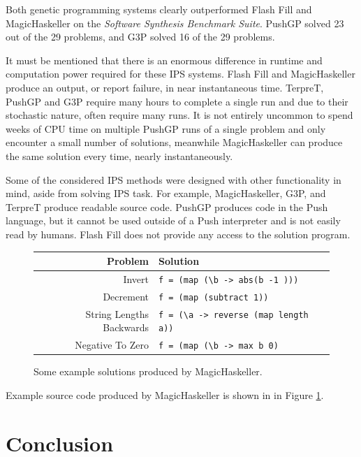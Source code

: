 Both genetic programming systems clearly outperformed Flash Fill and MagicHaskeller on the \emph{Software Synthesis Benchmark Suite}. PushGP solved  23 out of the 29 problems, and G3P solved 16 of the 29 problems.

It must be mentioned that there is an enormous difference in runtime and computation power required for these IPS systems. Flash Fill and MagicHaskeller produce an output, or report failure, in near instantaneous time. TerpreT, PushGP  and G3P require many hours to complete a single run and due to their stochastic nature, often require many runs. It is not entirely uncommon to spend weeks of CPU time on multiple PushGP runs of a single problem and only encounter a small number of solutions, meanwhile MagicHaskeller can produce the same solution every time, nearly instantaneously. 

Some of the considered IPS methods were designed with other functionality in mind, aside from solving IPS task. For example, MagicHaskeller, G3P, and TerpreT produce readable source code. PushGP produces code in the Push language, but it cannot be used outside of a Push interpreter and is not easily read by humans. Flash Fill does not provide any access to the solution program.

\begin{figure}
\begin{tabular}{ r | l }
\textbf{Problem} & \textbf{Solution} \\
\hline
Invert & \texttt{f = (map (\textbackslash b -> abs(b -1 )))} \\
Decrement & \texttt{f = (map (subtract 1))} \\ 
String Lengths Backwards & \texttt{f = (\textbackslash a -> reverse (map length a))} \\
Negative To Zero & \texttt{f = (map (\textbackslash b -> max b 0)} \\
\end{tabular}
\caption{Some example solutions produced by MagicHaskeller.}
\label{fig:MHsolutions}
\end{figure}

Example source code produced by MagicHaskeller is shown in in Figure \ref{fig:MHsolutions}.

\section{Conclusion}

